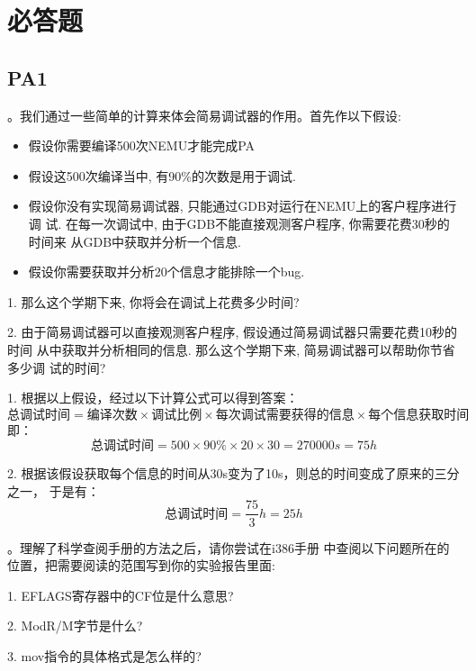 \chapter{必答题}
\section{PA1}

  。我们通过一些简单的计算来体会简易调试器的作用。首先作以下假设:
  \begin{itemize}
    \item 假设你需要编译500次NEMU才能完成PA
    \item 假设这500次编译当中, 有90\%的次数是用于调试.
    \item 假设你没有实现简易调试器, 只能通过GDB对运行在NEMU上的客户程序进行调
      试. 在每一次调试中, 由于GDB不能直接观测客户程序, 你需要花费30秒的时间来
      从GDB中获取并分析一个信息.
    \item 假设你需要获取并分析20个信息才能排除一个bug.
  \end{itemize}

  1. 那么这个学期下来, 你将会在调试上花费多少时间?

  2. 由于简易调试器可以直接观测客户程序, 假设通过简易调试器只需要花费10秒的时间
  从中获取并分析相同的信息. 那么这个学期下来, 简易调试器可以帮助你节省多少调
  试的时间?

\vspace{0.5em}

  1. 根据以上假设，经过以下计算公式可以得到答案：
  \[ \text{总调试时间} = \text{编译次数}\times\text{调试比例}\times\text{每次调试需要获得的信息}\times\text{每个信息获取时间} \]
  即：
  \[ \text{总调试时间} = 500 \times 90\% \times 20 \times 30 = 270000s = 75h \]
  
  2. 根据该假设获取每个信息的时间从30s变为了10s，则总的时间变成了原来的三分之一，
  于是有：
  \[ \text{总调试时间} = \frac{75}{3}h = 25h \]

\vspace{0.5em}

  。理解了科学查阅手册的方法之后，请你尝试在i386手册
  中查阅以下问题所在的位置，把需要阅读的范围写到你的实验报告里面:

  1. EFLAGS寄存器中的CF位是什么意思?

  2. ModR/M字节是什么?
  
  3. mov指令的具体格式是怎么样的?

